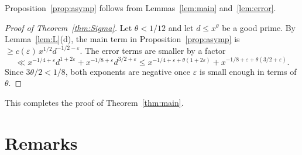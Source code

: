\documentclass[11pt]{amsart}
\theoremstyle{remark}
\theoremstyle{definition}
\numberwithin{equation}{section}
\newcommand{\eps}{\varepsilon}
\begin{document}
Proposition~\ref{prop:asymp} follows from Lemmas~\ref{lem:main} and~\ref{lem:error}.

\begin{proof}[Proof of Theorem~\ref{thm:Sigma}]
Let $\theta<1/12$ and let $d\le x^{\theta}$ be a good prime. By Lemma~\ref{lem:L}(d), the main term in Proposition~\ref{prop:asymp} is $\ge c(\eps)\,x^{1/2}d^{-1/2-\eps}$. The error terms are smaller by a factor
\[
\ll x^{-1/4+\eps}d^{1+2\eps}+x^{-1/8+\eps}d^{3/2+\eps}\le x^{-1/4+\eps+\theta(1+2\eps)}+x^{-1/8+\eps+\theta(3/2+\eps)}.
\]
Since $3\theta/2<1/8$, both exponents are negative once $\eps$ is small enough in terms of $\theta$.
\end{proof}

This completes the proof of Theorem~\ref{thm:main}.

\section{Remarks}
\end{document}
